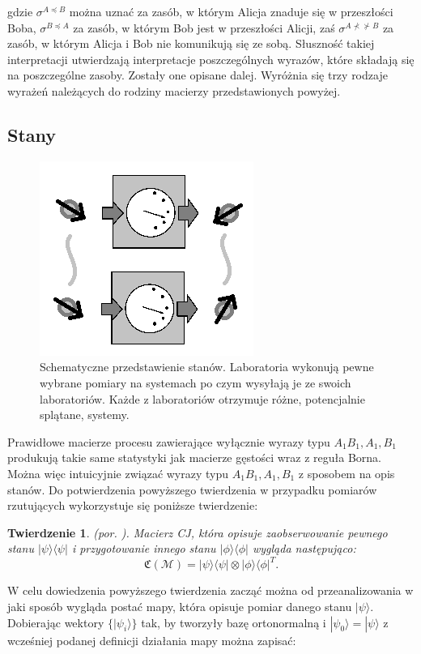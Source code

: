 \documentclass[10pt]{article} %
\newtheorem{tw}{Twierdzenie}
\newcommand{\Ket}[1]{|#1\rangle}
\newcommand{\Bra}[1]{\langle#1|}
\newcommand{\KP}{\Ket{\psi}}
\newcommand{\BP}{\Bra{\psi}}
\newcommand{\MCJ}{\mathfrak{C}}
\begin{document}
gdzie $\sigma^{A \preceq B}$ można uznać za zasób, w którym Alicja znaduje się w przeszłości Boba, $\sigma^{B \preceq A}$ za zasób, w którym Bob jest w przeszłości Alicji, zaś $\sigma^{A \nprec \nsucc B}$ za zasób, w którym Alicja i Bob nie komunikują się ze sobą. Słuszność takiej interpretacji utwierdzają interpretacje poszczególnych wyrazów, które składają się na poszczególne zasoby. Zostały one opisane dalej.
Wyróżnia się trzy rodzaje wyrażeń należących do rodziny macierzy przedstawionych powyżej.
\subsection{Stany}
\begin{figure}[h]
\centering
\includegraphics{obrazki/states_new}
\caption{Schematyczne przedstawienie stanów. Laboratoria wykonują pewne wybrane pomiary na systemach po czym wysyłają je ze swoich laboratoriów. Każde z laboratoriów otrzymuje różne, potencjalnie splątane, systemy.}
\end{figure}
Prawidłowe macierze procesu zawierające wyłącznie wyrazy typu $A_1 B_1, A_1, B_1$ produkują takie same statystyki jak macierze gęstości wraz z reguła Borna. 
Można więc intuicyjnie związać wyrazy typu $A_1 B_1, A_1, B_1$ z sposobem na opis stanów.
Do potwierdzenia powyższego twierdzenia w przypadku pomiarów rzutujących wykorzystuje się poniższe twierdzenie:
\begin{tw}
(por. \cite{process_matrix}).
Macierz CJ, która opisuje zaobserwowanie pewnego stanu $\KP\BP$ i przygotowanie innego stanu $\Ket{\phi}\Bra{\phi}$ wygląda następująco:
\begin{equation}
\MCJ(\mathcal{M}) = \KP\BP \otimes \Ket{\phi}\Bra{\phi}^T.
\end{equation}
\end{tw}
W celu dowiedzenia powyższego twierdzenia zacząć można od przeanalizowania w jaki sposób wygląda postać mapy, która opisuje pomiar danego stanu $\Ket{\psi}$. Dobierając wektory $\{ \Ket{\psi_i} \}$ tak, by tworzyły bazę ortonormalną i $\Ket{\psi_0} = \Ket{\psi}$ z wcześniej podanej definicji działania mapy można zapisać:
\end{document}
